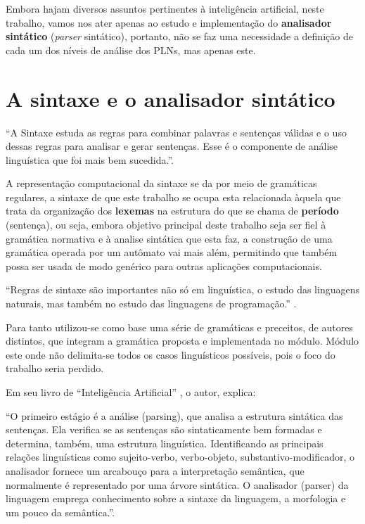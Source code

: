 \documentclass[12pt,a4paper,oneside,english,brazilian,brazil]{abntex2}
\begin{document}
\par Embora hajam diversos assuntos pertinentes à inteligência artificial, neste trabalho, vamos nos ater apenas ao estudo e implementação do \textbf{analisador sintático} (\textit{parser} sintático), portanto, não se faz uma necessidade a definição de cada um dos níveis de análise dos PLNs, mas apenas este. \

\section{A sintaxe e o analisador sintático}



\begin{citacao}
``A Sintaxe estuda as regras para combinar palavras e sentenças válidas e o uso dessas regras para analisar e gerar sentenças. Esse é o componente de análise linguística que foi mais bem sucedida.''.\cite{luger}
\end{citacao}

\par A representação computacional da sintaxe se da por meio de gramáticas regulares, a sintaxe de que este trabalho se ocupa esta relacionada àquela que trata da organização dos \textbf{lexemas} na estrutura do que se chama de \textbf{período} (sentença), ou seja, embora objetivo principal deste trabalho seja ser fiel à gramática normativa e à analise sintática que esta faz, a construção de uma gramática operada por um autômato vai mais além, permitindo que também possa ser usada de modo genérico para outras aplicações computacionais. \

\begin{citacao}
``Regras de sintaxe são importantes não só em linguística, o estudo das linguagens naturais, mas também no estudo das linguagens de programação.'' \cite{matdiscreta1}.
\end{citacao}

\par Para tanto utilizou-se como base uma série de gramáticas e preceitos, de autores distintos, que integram a gramática proposta e implementada no módulo. Módulo este onde não delimita-se todos os casos linguísticos possíveis, pois o foco do trabalho seria perdido. \

\par Em seu livro de ``Inteligência Artificial'' \cite{luger}, o autor, explica: \


\begin{citacao}
``O primeiro estágio  é a análise (parsing), que analisa a estrutura sintática das sentenças. Ela verifica se as sentenças são sintaticamente bem formadas e determina, também, uma estrutura linguística. Identificando as principais relações linguísticas como sujeito-verbo, verbo-objeto, substantivo-modificador, o analisador fornece um arcabouço para a interpretação semântica, que normalmente é representado por uma árvore sintática. O analisador (parser) da linguagem emprega conhecimento sobre a sintaxe da linguagem, a morfologia e um pouco da semântica.''.\cite{luger}
\end{citacao}
\end{document}
